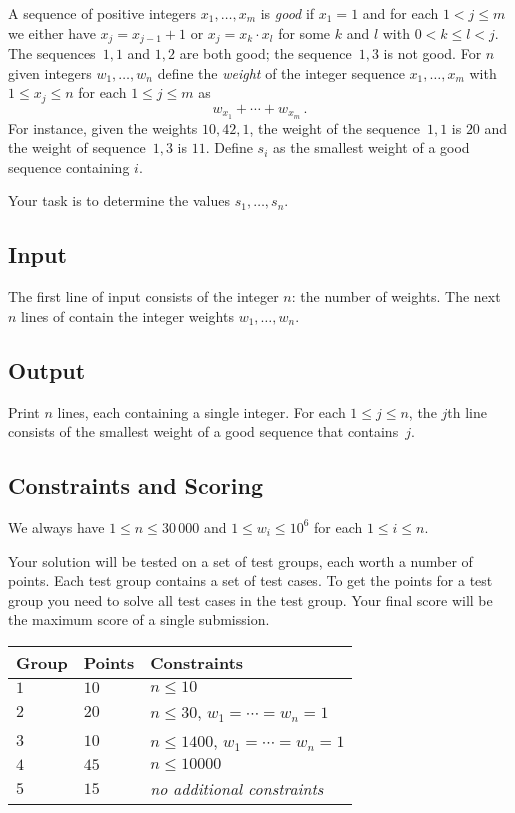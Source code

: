 
A sequence of positive integers $x_1,\ldots,x_m$ is \emph{good} if  $x_1 = 1$ and for each $1 < j \leq m$ we either have $x_j=x_{j-1}+1$ or $x_j=x_k\cdot x_l$ for some $k$ and $l$ with $0< k\leq l< j$.
The sequences~$1,1$ and $1,2$ are both good; the sequence~$1,3$ is not good.
For  $n$ given integers $w_1,\ldots,w_n$ define 
the \emph{weight} of the integer sequence $x_1,\ldots,x_m$ with $1\leq x_j \leq n$ for each $1\leq j\leq m$ as
\[ w_{x_1} +\cdots +w_{x_m}\,.\] 
For instance, given the weights $10, 42, 1$, the weight of the sequence~$1,1$ is $20$ and the weight of sequence~$1,3$ is $11$.
Define $s_i$ as the smallest weight of a good sequence containing $i$.

Your task is to determine the values $s_1,\ldots ,s_n$.

\subsection*{Input}

The first line of input consists of the integer $n$: the number of weights.
The next $n$ lines of contain the integer weights $w_1, \ldots, w_n$.

\subsection*{Output}

Print $n$ lines, each containing a single integer.
For each $1\leq j \leq n$, the $j$th line consists of the smallest weight of a good sequence that contains~$j$.

\subsection*{Constraints and Scoring}

We always have
$1\leq n \leq 30\,000$ %
and
$1\leq w_i \leq 10^6$ for each $1\leq i \leq n$.%

Your solution will be tested on a set of test groups, each worth a number of points.
Each test group contains a set of test cases.
To get the points for a test group you need to solve all test cases in the test group.
Your final score will be the maximum score of a single submission.

\medskip
\begin{tabular}{lll}
Group & Points & Constraints \\\hline
$1$   & $10$ & $n\leq 10$ \\
$2$   & $20$ & $n\leq 30$, $w_1=\cdots=w_n = 1$ \\
$3$   & $10$ & $n\leq 1400$, $w_1=\cdots=w_n = 1$ \\
$4$   & $45$ & $n\leq 10000$\\
$5$   & $15$ & \emph{no additional constraints}
\end{tabular}
